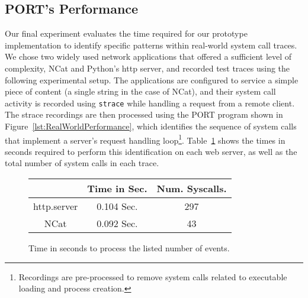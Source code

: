\subsection{PORT's Performance}

Our final experiment evaluates the
time required for our prototype implementation
to identify specific
patterns within real-world system call traces.
We chose two widely used network applications that offered a sufficient level of complexity,
NCat
and
Python's http server,
and recorded test traces using the following 
experimental setup.  The applications are configured to service
a simple piece of content (a single string in the case of NCat), and their system call activity is
recorded using {\tt strace} while handling a request from a remote client.
The strace recordings are then processed using the PORT program shown in
Figure~\ref{lst:RealWorldPerformance},  which
identifies the sequence of system calls that implement
a server's request handling loop\footnote{Recordings are pre-processed to remove system calls
related to executable loading and process creation.}.  Table~\ref{tbl:RealWorldPerformance}
shows the times in seconds required to perform this identification on each
web server, as well as the total number of system calls in each trace.

\begin{figure}[t]
\centering
  \begin{tabular}{|c|c|c}
                & Time in Sec. & Num. Syscalls.\\
              \hline
  http.server   & 0.104 Sec.   & 297   \\
  NCat          & 0.092 Sec.   & 43      \\
\end{tabular}
\caption{Time in seconds to process the listed number of events.}
\label{tbl:RealWorldPerformance}
\end{figure}

%

